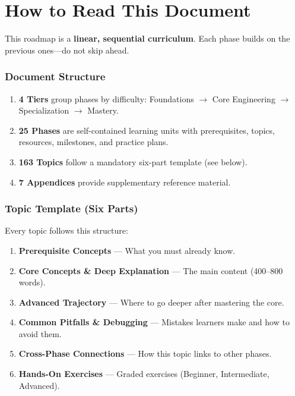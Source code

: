 \documentclass[11pt, a4paper, oneside]{report}
\begin{document}
\chapter*{How to Read This Document}

This roadmap is a \textbf{linear, sequential curriculum}. Each phase builds on the previous ones---do not skip ahead.

\subsection*{Document Structure}
\begin{enumerate}
\item \textbf{4 Tiers} group phases by difficulty: Foundations $\to$ Core Engineering $\to$ Specialization $\to$ Mastery.
\item \textbf{25 Phases} are self-contained learning units with prerequisites, topics, resources, milestones, and practice plans.
\item \textbf{163 Topics} follow a mandatory six-part template (see below).
\item \textbf{7 Appendices} provide supplementary reference material.
\end{enumerate}

\subsection*{Topic Template (Six Parts)}
Every topic follows this structure:
\begin{enumerate}
\item \textbf{Prerequisite Concepts} --- What you must already know.
\item \textbf{Core Concepts \& Deep Explanation} --- The main content (400--800 words).
\item \textbf{Advanced Trajectory} --- Where to go deeper after mastering the core.
\item \textbf{Common Pitfalls \& Debugging} --- Mistakes learners make and how to avoid them.
\item \textbf{Cross-Phase Connections} --- How this topic links to other phases.
\item \textbf{Hands-On Exercises} --- Graded exercises (Beginner, Intermediate, Advanced).
\end{enumerate}
\end{document}
